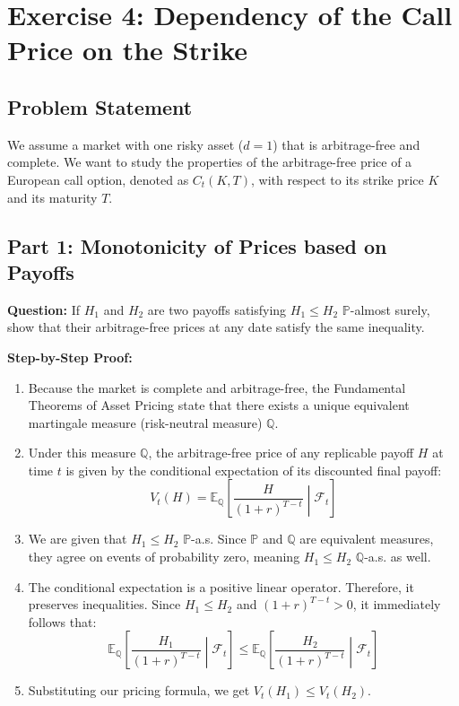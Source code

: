 \section{Exercise 4: Dependency of the Call Price on the Strike}

\subsection{Problem Statement}
We assume a market with one risky asset ($d=1$) that is arbitrage-free and complete. We want to study the properties of the arbitrage-free price of a European call option, denoted as $C_t(K,T)$, with respect to its strike price $K$ and its maturity $T$.

\subsection{Part 1: Monotonicity of Prices based on Payoffs}

\textbf{Question:} If $H_1$ and $H_2$ are two payoffs satisfying $H_1 \le H_2$ $\mathbb{P}$-almost surely, show that their arbitrage-free prices at any date satisfy the same inequality.

\textbf{Step-by-Step Proof:}
\begin{enumerate}
    \item Because the market is complete and arbitrage-free, the Fundamental Theorems of Asset Pricing state that there exists a unique equivalent martingale measure (risk-neutral measure) $\mathbb{Q}$.
    \item Under this measure $\mathbb{Q}$, the arbitrage-free price of any replicable payoff $H$ at time $t$ is given by the conditional expectation of its discounted final payoff:
    \begin{equation}
        V_t(H) = \mathbb{E}_{\mathbb{Q}} \left[ \frac{H}{(1+r)^{T-t}} \middle| \mathcal{F}_t \right]
    \end{equation}
    \item We are given that $H_1 \le H_2$ $\mathbb{P}$-a.s. Since $\mathbb{P}$ and $\mathbb{Q}$ are equivalent measures, they agree on events of probability zero, meaning $H_1 \le H_2$ $\mathbb{Q}$-a.s. as well.
    \item The conditional expectation is a positive linear operator. Therefore, it preserves inequalities. Since $H_1 \le H_2$ and $(1+r)^{T-t} > 0$, it immediately follows that:
    \begin{equation}
        \mathbb{E}_{\mathbb{Q}} \left[ \frac{H_1}{(1+r)^{T-t}} \middle| \mathcal{F}_t \right] \le \mathbb{E}_{\mathbb{Q}} \left[ \frac{H_2}{(1+r)^{T-t}} \middle| \mathcal{F}_t \right]
    \end{equation}
    \item Substituting our pricing formula, we get $V_t(H_1) \le V_t(H_2)$.
\end{enumerate}

